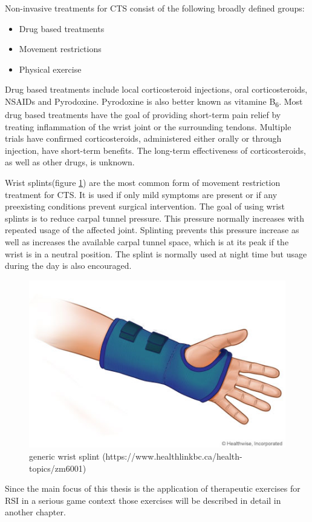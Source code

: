 Non-invasive treatments for \gls{CTS} consist of the following broadly defined groups:
\begin{itemize}
	\item Drug based treatments
	\item Movement restrictions
	\item Physical exercise
\end{itemize}

Drug based treatments include local corticosteroid injections, oral corticosteroids, \gls{NSAIDs} and Pyrodoxine.
Pyrodoxine is also better known as vitamine B\textsubscript{6}.
Most drug based treatments have the goal of providing short-term pain relief by treating inflammation of the wrist joint or the surrounding tendons.
Multiple trials have confirmed corticosteroids, administered either orally or through injection, have short-term benefits\cite{van2007repetitive}.
The long-term effectiveness of corticosteroids, as well as other drugs, is unknown.

Wrist splints(figure \ref{fig:wrist-splint}) are the most common form of movement restriction treatment for \gls{CTS}.
It is used if only mild symptoms are present or if any preexisting conditions prevent surgical intervention.
The goal of using wrist splints is to reduce carpal tunnel pressure\cite{kruger1991carpal}.
This pressure normally increases with repeated usage of the affected joint.
Splinting prevents this pressure increase as well as increases the available carpal tunnel space, which is at its peak if the wrist is in a neutral position.
The splint is normally used at night time but usage during the day is also encouraged.

\begin{figure}
	\centering
	\includegraphics[width=0.4\linewidth]{figures/wrist-splint}
	\caption{generic wrist splint (https://www.healthlinkbc.ca/health-topics/zm6001)}
	\label{fig:wrist-splint}
\end{figure}

Since the main focus of this thesis is the application of therapeutic exercises for \gls{RSI} in a serious game context those exercises will be described in detail in another chapter.

